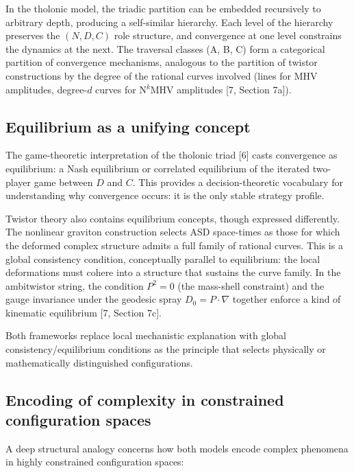 \documentclass[12pt]{article}
\begin{document}
In the tholonic model, the triadic partition can be embedded recursively
to arbitrary depth, producing a self-similar hierarchy. Each level of
the hierarchy preserves the \((N, D, C)\) role structure, and
convergence at one level constrains the dynamics at the next. The
traversal classes (A, B, C) form a categorical partition of convergence
mechanisms, analogous to the partition of twistor constructions by the
degree of the rational curves involved (lines for MHV amplitudes,
degree-\(d\) curves for N\(^k\)MHV amplitudes {[}7, Section 7a{]}).

\subsection{Equilibrium as a unifying concept}\label{equilibrium-as-a-unifying-concept}

The game-theoretic interpretation of the tholonic triad {[}6{]} casts
convergence as equilibrium: a Nash equilibrium or correlated equilibrium
of the iterated two-player game between \(D\) and \(C\). This provides a
decision-theoretic vocabulary for understanding why convergence occurs:
it is the only stable strategy profile.

Twistor theory also contains equilibrium concepts, though expressed
differently. The nonlinear graviton construction selects ASD space-times
as those for which the deformed complex structure admits a full family
of rational curves. This is a global consistency condition, conceptually
parallel to equilibrium: the local deformations must cohere into a
structure that sustains the curve family. In the ambitwistor string, the
condition \(P^2 = 0\) (the mass-shell constraint) and the gauge
invariance under the geodesic spray \(D_0 = P \cdot \nabla\) together
enforce a kind of kinematic equilibrium {[}7, Section 7c{]}.

Both frameworks replace local mechanistic explanation with global
consistency/equilibrium conditions as the principle that selects
physically or mathematically distinguished configurations.

\subsection{Encoding of complexity in constrained configuration spaces}\label{encoding-of-complexity-in-constrained-configuration-spaces}

A deep structural analogy concerns how both models encode complex
phenomena in highly constrained configuration spaces:
\end{document}
